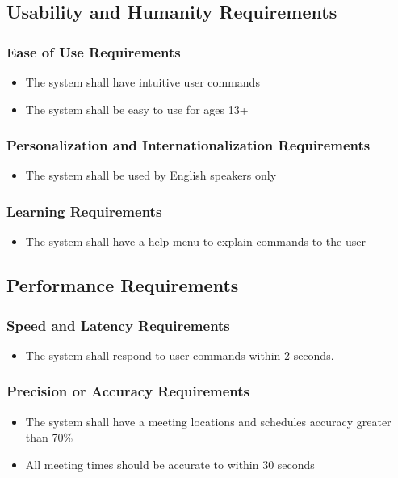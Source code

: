 \documentclass[12pt, titlepage]{article}
\begin{document}
\subsection{Usability and Humanity Requirements}
\subsubsection{Ease of Use Requirements}
\begin{itemize}
    \item The system shall have intuitive user commands
    \item The system shall be easy to use for ages 13+
\end{itemize}
\subsubsection{Personalization and Internationalization Requirements}
\begin{itemize}
    \item The system shall be used by English speakers only
\end{itemize}
\subsubsection{Learning Requirements}
\begin{itemize}
    \item The system shall have a help menu to explain commands to the user
\end{itemize}

\subsection{Performance Requirements}
\subsubsection{Speed and Latency Requirements}
\begin{itemize}
    \item The system shall respond to user commands within 2 seconds.
\end{itemize}
\subsubsection{Precision or Accuracy Requirements}
\begin{itemize}
    \item The system shall have a meeting locations and schedules accuracy greater than 70\%
    \item All meeting times should be accurate to within 30 seconds
\end{itemize}
\end{document}
